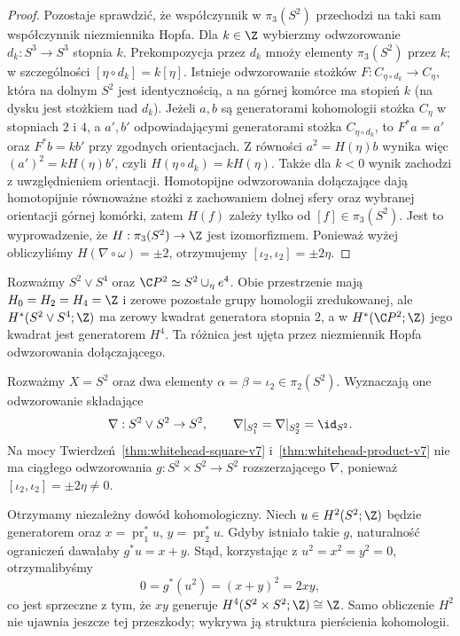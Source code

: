 \begin{proof}
Pozostaje sprawdzić, że współczynnik w $\pi_3(S^2)$
przechodzi na taki sam współczynnik niezmiennika Hopfa.
Dla $k\in\Z$ wybierzmy odwzorowanie
$d_k:S^3\to S^3$ stopnia $k$. Prekompozycja
przez $d_k$ mnoży elementy $\pi_3(S^2)$ przez $k$;
w szczególności $[\eta\circ d_k]=k[\eta]$.
Istnieje odwzorowanie stożków
$F:C_{\eta\circ d_k}\to C_\eta$, która na dolnym
$S^2$ jest identycznością, a na górnej komórce ma
stopień $k$ (na dysku jest stożkiem nad $d_k$).
Jeżeli $a,b$ są generatorami kohomologii stożka $C_\eta$
w stopniach $2$ i $4$, a $a',b'$ odpowiadającymi
generatorami stożka $C_{\eta\circ d_k}$, to
$F^*a=a'$ oraz $F^*b=kb'$ przy zgodnych orientacjach.
Z równości $a^2=H(\eta)b$ wynika więc
$(a')^2=kH(\eta)b'$, czyli
$H(\eta\circ d_k)=kH(\eta)$. Także dla $k<0$
wynik zachodzi z uwzględnieniem orientacji.
Homotopijne odwzorowania dołączające dają homotopijnie
równoważne stożki z zachowaniem dolnej sfery
oraz wybranej orientacji górnej komórki, zatem
$H(f)$ zależy tylko od $[f]\in\pi_3(S^2)$.
Jest to wyprowadzenie, że $H:\pi_3(S^2)\to\Z$
jest izomorfizmem. Ponieważ wyżej obliczyliśmy
$H(\nabla\circ\omega)=\pm2$, otrzymujemy
$[\iota_2,\iota_2]=\pm2\eta$.
\end{proof}

\begin{przyklad}
Rozważmy $S^2\vee S^4$ oraz
$\C P^2\simeq S^2\cup_{\eta}e^4$.
Obie przestrzenie mają $H_0=H_2=H_4=\Z$ i zerowe
pozostałe grupy homologii zredukowanej, ale
$H^*(S^2\vee S^4;\Z)$ ma zerowy kwadrat generatora
stopnia $2$, a w $H^*(\C P^2;\Z)$ jego kwadrat
jest generatorem $H^4$. Ta różnica jest ujęta
przez niezmiennik Hopfa odwzorowania dołączającego.
\end{przyklad}


\begin{przyklad}
\label{prz:whitehead-fold-product-v7}
Rozważmy $X=S^2$ oraz dwa elementy
$\alpha=\beta=\iota_2\in\pi_2(S^2)$. Wyznaczają one
odwzorowanie składające
\[\nabla:S^2\vee S^2\to S^2,\qquad
\nabla|_{S_1^2}=\nabla|_{S_2^2}=\id_{S^2}.\]
Na mocy Twierdzeń~\ref{thm:whitehead-square-v7}
i~\ref{thm:whitehead-product-v7} nie ma ciągłego
odwzorowania $g:S^2\times S^2\to S^2$ rozszerzającego
$\nabla$, ponieważ $[\iota_2,\iota_2]=\pm2\eta\ne0$.

Otrzymamy niezależny dowód kohomologiczny.
Niech $u\in H^2(S^2;\Z)$ będzie generatorem oraz
$x=\operatorname{pr}_1^*u$, $y=\operatorname{pr}_2^*u$.
Gdyby istniało takie $g$, naturalność ograniczeń
dawałaby $g^*u=x+y$. Stąd, korzystając z
$u^2=x^2=y^2=0$, otrzymalibyśmy
\[0=g^*(u^2)=(x+y)^2=2xy,\]
co jest sprzeczne z tym, że
$xy$ generuje $H^4(S^2\times S^2;\Z)\cong\Z$.
Samo obliczenie $H^2$ nie ujawnia jeszcze tej przeszkody;
wykrywa ją struktura pierścienia kohomologii.
\end{przyklad}


